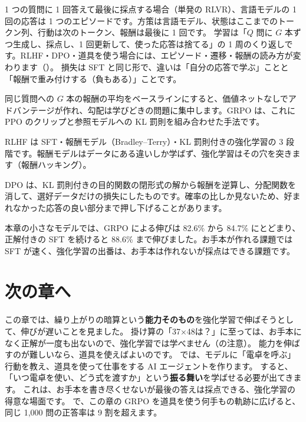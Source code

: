 \begin{summary}
\item 1 つの質問に 1 回答えて最後に採点する場合（単発の RLVR）、言語モデルの 1 回の応答は 1 つのエピソードです。方策は言語モデル、状態はここまでのトークン列、行動は次のトークン、報酬は最後に 1 回です。
学習は「$Q$ 問に $G$ 本ずつ生成し、採点し、1 回更新して、使った応答は捨てる」の 1 周のくり返しです。RLHF・DPO・道具を使う場合には、エピソード・遷移・報酬の読み方が変わります（）。
損失は SFT と同じ形で、違いは「自分の応答で学ぶ」ことと「報酬で重み付けする（負もある）」ことです。
\item 同じ質問への $G$ 本の報酬の平均をベースラインにすると、価値ネットなしでアドバンテージが作れ、勾配は学びどきの問題に集中します。GRPO は、これに PPO のクリップと参照モデルへの KL 罰則を組み合わせた手法です。
\item RLHF は SFT・報酬モデル（Bradley--Terry）・KL 罰則付きの強化学習の 3 段階です。報酬モデルはデータにある違いしか学ばず、強化学習はその穴を突きます（報酬ハッキング）。
\item DPO は、KL 罰則付きの目的関数の閉形式の解から報酬を逆算し、分配関数を消して、選好データだけの損失にしたものです。確率の比しか見ないため、好まれなかった応答の良い部分まで押し下げることがあります。
\item 本章の小さなモデルでは、GRPO による伸びは 82.6\% から 84.7\% にとどまり、正解付きの SFT を続けると 88.6\% まで伸びました。お手本が作れる課題では SFT が速く、強化学習の出番は、お手本は作れないが採点はできる課題です。
\end{summary}

\section*{次の章へ}
この章では、繰り上がりの暗算という\textbf{能力そのもの}を強化学習で伸ばそうとして、伸びが遅いことを見ました。
掛け算の「37×48は？」に至っては、お手本になく正解が一度も出ないので、強化学習では学べません（の注意）。
能力を伸ばすのが難しいなら、道具を使えばよいのです。
では、モデルに「電卓を呼ぶ」行動を教え、道具を使って仕事をする AI エージェントを作ります。
すると、「いつ電卓を使い、どう式を渡すか」という\textbf{振る舞い}を学ばせる必要が出てきます。
これは、お手本を書き尽くせないが最後の答えは採点できる、強化学習の得意な場面です。
で、この章の GRPO を道具を使う何手もの軌跡に広げると、同じ 1,000 問の正答率は 9 割を超えます。

